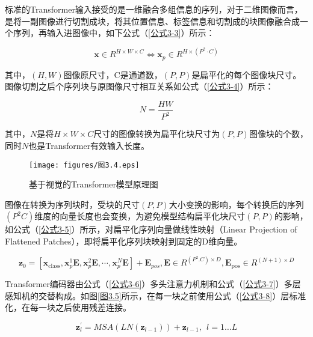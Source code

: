 标准的Transformer输入接受的是一维融合多组信息的序列，对于二维图像而言，是将一副图像进行切割成块，将其位置信息、标签信息和切割成的块图像融合成一个序列，再输入进图像中，如下公式（\ref{公式3-3}）所示：


\begin{equation}\label{公式3-3}
	\mathbf{x} \in R^{H \times W \times C} \Leftrightarrow \mathbf{x}_{p} \in R^{H \times\left(P^{2} \cdot C\right)}
\end{equation}

其中，$\left(H,W\right)$图像原尺寸，C是通道数，$\left(P,P\right)$是扁平化的每个图像块尺寸。
图像切割之后个序列块与原图像尺寸相互关系如公式（\ref{公式3-4}）所示：

\begin{equation}\label{公式3-4}
	N=\frac{HW}{P^2}
\end{equation}

其中，$N$是将$H\times W\times C$尺寸的图像转换为扁平化块尺寸为$\left(P,P\right)$图像块的个数，同时$N$也是Transformer有效输入长度。

\begin{figure}[!ht]
	\centering
	\texttt{[image: figures/图3.4.eps]}
	\caption{基于视觉的Transformer模型原理图}\label{图3.4}
\end{figure}


图像在转换为序列块时，受块的尺寸$\left(P,P\right)$大小变换的影响，每个转换后的序列$\left(P^2C\right)$维度的向量长度也会变换，为避免模型结构扁平化块尺寸$\left(P,P\right)$的影响，如公式（\ref{公式3-5}）所示，对扁平化序列向量做线性映射（Linear Projection of Flattened Patches），即将扁平化序列块映射到固定的D维向量。

\begin{equation}\label{公式3-5}
\mathbf{z}_0=\left[\mathbf{x}_{\mathrm{class}},\mathbf{x}_p^1\mathbf{E},\mathbf{x}_p^2\mathbf{E},\cdots,\mathbf{x}_p^N\mathbf{E}\right]+\mathbf{E}_{pos},\mathbf{E}\in R^{\left(P^2.C\right)\times D},\mathbf{E}_{\mathrm{pos}}\in R^{\left(N+1\right)\times D}
\end{equation}

Transformer编码器由公式（\ref{公式3-6}）多头注意力机制和公式（\ref{公式3-7}）多层感知机的交替构成。如图\ref{图3.5}所示，在每一块之前使用公式（\ref{公式3-8}）层标准化，在每一块之后使用残差连接。


\begin{equation}\label{公式3-6}
	\mathbf{z}_l^\prime=MSA\left(LN\left(\mathbf{z}_{l-1}\right)\right)+\mathbf{z}_{l-1},\ \ l=1\ldots L
\end{equation}

